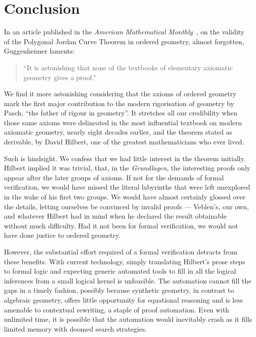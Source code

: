 \chapter{Conclusion}\label{chapter:Conclusion}
In an article published in the \emph{American Mathematical Monthly}~\cite{GuggenheimerJordanProof}, on the validity of the Polygonal Jordan Curve Theorem in ordered geometry, almost forgotten, Guggenheimer laments:
\begin{quotation}
  ``It is astonishing that none of the textbooks of elementary axiomatic geometry gives a proof.''
\end{quotation}

We find it more astonishing considering that the axioms of ordered geometry mark the first major contribution to the modern rigorisation of geometry by Pasch, ``the father of rigour in geometry''. It stretches all our credibility when those same axioms were delineated in the most influential textbook on modern axiomatic geometry, nearly eight decades earlier,  and the theorem stated as derivable, by David Hilbert, one of the greatest mathematicians who ever lived.

Such is hindsight. We confess that we had little interest in the theorem initially. Hilbert implied it was trivial, that, in the \emph{Grundlagen}, the interesting proofs only appear after the later groups of axioms. If not for the demands of formal verification, we would have missed the literal labyrinths that were left unexplored in the wake of his first two groups. We would have almost certainly glossed over the details, letting ourselves be convinced by invalid proofs --- Veblen's, our own, and whatever Hilbert had in mind when he declared the result obtainable without much difficulty. Had it not been for formal verification, we would not have done justice to ordered geometry.

However, the substantial effort required of a formal verification detracts from these benefits. With current technology, simply translating Hilbert's prose steps to formal logic and expecting generic automated tools to fill in all the logical inferences from a small logical kernel is unfeasible. The automation cannot fill the gaps in a timely fashion, possibly because synthetic geometry, in contrast to algebraic geometry, offers little opportunity for equational reasoning and is less amenable to contextual rewriting, a staple of proof automation. Even with unlimited time, it is possible that the automation would inevitably crash as it fills limited memory with doomed search strategies.

